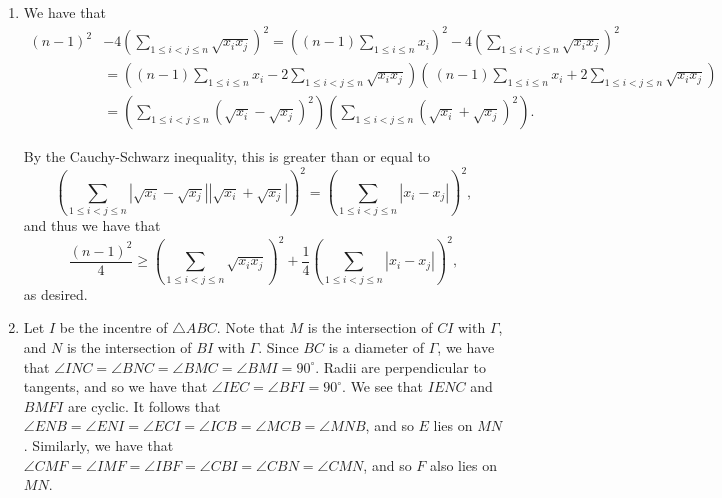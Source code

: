 \documentclass[12pt]{article}
\begin{document}
\begin{enumerate}
\item %
We have that
\begin{align*}
    (n - 1)^2 & - 4 \left(\sum_{1 \leq i < j \leq n} \sqrt{x_i x_j} \right)^2 
     = \left( (n - 1) \sum_{1 \leq i \leq n} x_i \right)^2 - 4 \left(\sum_{1
    \leq i < j \leq n} \sqrt{x_i x_j} \right)^2 \\
    & = \left( (n - 1) \sum_{1 \leq i \leq n} x_i - 2 \sum_{1 \leq i < j \leq n}
    \sqrt{x_i x_j} \right) \left( \ (n - 1) \sum_{1 \leq i \leq n} x_i + 2
    \sum_{1 \leq i < j \leq n} \sqrt{x_i x_j} \right) \\
    & = \left( \sum_{1 \leq i < j \leq n} (\sqrt{x_i} - \sqrt{x_j})^2 \right)
        \left( \sum_{1 \leq i < j \leq n} (\sqrt{x_i} + \sqrt{x_j})^2 \right).
\end{align*}

By the Cauchy-Schwarz inequality, this is greater than or equal to
\[
    \left( \sum_{1 \leq i < j \leq n} | \sqrt{x_i} - \sqrt{x_j} | | \sqrt{x_i} +
    \sqrt{x_j} | \right)^2 = \left( \sum_{1 \leq i < j \leq n} | x_i - x_j |
    \right)^2,
\]
and thus we have that
\[
    \frac{(n - 1)^2}{4} \geq \left( \sum_{1 \leq i < j \leq n} \sqrt{x_i x_j}
    \right)^2 + \frac{1}{4} \left( \sum_{1 \leq i < j \leq n} |x_i - x_j|
    \right)^2,
\]
as desired.

\item %
Let $I$ be the incentre of $\triangle ABC$. Note that $M$ is the intersection of
$CI$ with $\Gamma$, and $N$ is the intersection of $BI$ with $\Gamma$. Since
$BC$ is a diameter of $\Gamma$, we have that $\angle INC = \angle BNC = \angle
BMC = \angle BMI = 90^\circ$. Radii are perpendicular to tangents, and so we
have that $\angle IEC = \angle BFI = 90^\circ$. We see that $IENC$ and $BMFI$
are cyclic. It follows that $\angle ENB = \angle ENI = \angle ECI = \angle ICB =
\angle MCB = \angle MNB$, and so $E$ lies on $MN$. Similarly, we have that
$\angle CMF = \angle IMF = \angle IBF = \angle CBI = \angle CBN = \angle CMN$,
and so $F$ also lies on $MN$.


\end{enumerate}
\end{document}

